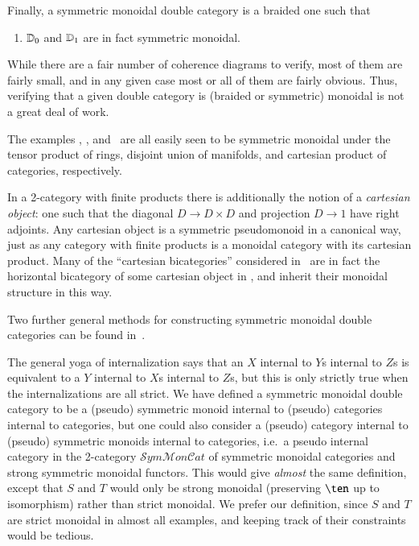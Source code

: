 \documentclass{amsart}
\begin{document}
Finally, a symmetric monoidal double category is a braided one such that
\begin{enumerate}\setcounter{enumi}{\value{mondbl}}
\item $\mathbb{D}_0$ and $\mathbb{D}_1$ are in fact symmetric monoidal.
\end{enumerate}
While there are a fair number of coherence diagrams to verify, most of
them are fairly small, and in any given case most or all of them are
fairly obvious.  Thus, verifying that a given double category is
(braided or symmetric) monoidal is not a great deal of work.

\begin{eg}
  The examples \lMod, \lnCob, and \lProf\ are all easily seen to be
  symmetric monoidal under the tensor product of rings, disjoint union
  of manifolds, and cartesian product of categories, respectively.
\end{eg}

\begin{rmk}
  In a 2-category with finite products there is additionally the
  notion of a \emph{cartesian object}: one such that the diagonal
  $D\to D\times D$ and projection $D\to 1$ have right adjoints.  Any
  cartesian object is a symmetric pseudomonoid in a canonical way,
  just as any category with finite products is a monoidal category
  with its cartesian product.  Many of the ``cartesian bicategories''
  considered in~\cite{cw:cart-bicats-i,ckww:cartbicats-ii} are in
  fact the horizontal bicategory of some cartesian object in \cDbl,
  and inherit their monoidal structure in this way.
\end{rmk}

Two further general methods for constructing symmetric monoidal double
categories can be found in~\cite{shulman:frbi}.

\begin{rmk}
  The general yoga of internalization says that an $X$ internal to
  $Y$s internal to $Z$s is equivalent to a $Y$ internal to $X$s
  internal to $Z$s, but this is only strictly true when the
  internalizations are all strict.  We have defined a symmetric
  monoidal double category to be a (pseudo) symmetric monoid internal
  to (pseudo) categories internal to categories, but one could also
  consider a (pseudo) category internal to (pseudo) symmetric monoids
  internal to categories, i.e.\ a pseudo internal category in the
  2-category
  $\mathcal{S}\mathit{ym}\mathcal{M}\mathit{on}\mathcal{C}\mathit{at}$
  of symmetric monoidal categories and strong symmetric monoidal
  functors.  This would give \emph{almost} the same definition, except
  that $S$ and $T$ would only be strong monoidal (preserving $\ten$ up
  to isomorphism) rather than strict monoidal.  We prefer our
  definition, since $S$ and $T$ are strict monoidal in almost all
  examples, and keeping track of their constraints would be tedious.
\end{rmk}
\end{document}
